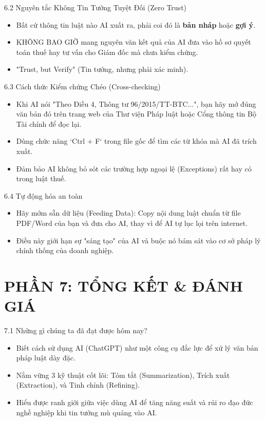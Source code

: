 \documentclass[aspectratio=169]{beamer}
\begin{document}
\begin{frame}{6.2 Nguyên tắc Không Tin Tưởng Tuyệt Đối (Zero Trust)}
    \begin{itemize}
        \item Bất cứ thông tin luật nào AI xuất ra, phải coi đó là \textbf{bản nháp} hoặc \textbf{gợi ý}.
        \item KHÔNG BAO GIỜ mang nguyên văn kết quả của AI đưa vào hồ sơ quyết toán thuế hay tư vấn cho Giám đốc mà chưa kiểm chứng.
        \item "Trust, but Verify" (Tin tưởng, nhưng phải xác minh).
    \end{itemize}
\end{frame}


\begin{frame}{6.3 Cách thức Kiểm chứng Chéo (Cross-checking)}
    \begin{itemize}
        \item Khi AI nói "Theo Điều 4, Thông tư 96/2015/TT-BTC...", bạn hãy mở đúng văn bản đó trên trang web của Thư viện Pháp luật hoặc Cổng thông tin Bộ Tài chính để đọc lại.
        \item Dùng chức năng `Ctrl + F` trong file gốc để tìm các từ khóa mà AI đã trích xuất.
        \item Đảm bảo AI không bỏ sót các trường hợp ngoại lệ (Exceptions) rất hay có trong luật thuế.
    \end{itemize}
\end{frame}


\begin{frame}{6.4 Tự động hóa an toàn}
    \begin{itemize}
        \item Hãy mớm sẵn dữ liệu (Feeding Data): Copy nội dung luật chuẩn từ file PDF/Word của bạn và đưa cho AI, thay vì để AI tự lục lọi trên internet.
        \item Điều này giới hạn sự "sáng tạo" của AI và buộc nó bám sát vào cơ sở pháp lý chính thống của doanh nghiệp.
    \end{itemize}
\end{frame}


\section{PHẦN 7: TỔNG KẾT \& ĐÁNH GIÁ}


\begin{frame}{7.1 Những gì chúng ta đã đạt được hôm nay?}
    \begin{itemize}
        \item Biết cách sử dụng AI (ChatGPT) như một công cụ đắc lực để xử lý văn bản pháp luật dày đặc.
        \item Nắm vững 3 kỹ thuật cốt lõi: Tóm tắt (Summarization), Trích xuất (Extraction), và Tinh chỉnh (Refining).
        \item Hiểu được ranh giới giữa việc dùng AI để tăng năng suất và rủi ro đạo đức nghề nghiệp khi tin tưởng mù quáng vào AI.
    \end{itemize}
\end{frame}
\end{document}
